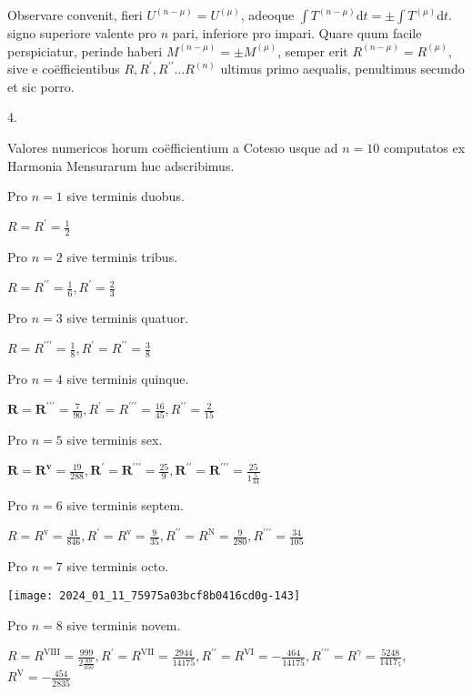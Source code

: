 \documentclass[10pt]{article}
\begin{document}
Observare convenit, fieri \(U^{(n-\mu)}=U^{(\mu)}\), adeoque \(\int T^{(n-\mu)} \mathrm{d} t= \pm \int T^{(\mu)} \mathrm{d} t\). signo superiore valente pro \(n\) pari, inferiore pro impari. Quare quum facile perspiciatur, perinde haberi \(M^{(n-\mu)}= \pm M^{(\mu)}\), semper erit \(R^{(n-\mu)}=R^{(\mu)}\), sive \(\mathrm{e}\) coëfficientibus \(R, R^{\prime}, R^{\prime \prime} \ldots R^{(n)}\) ultimus primo aequalis, penultimus secundo et sic porro.

4.

Valores numericos horum coëfficientium a Cotesıo usque ad \(n=10\) computatos ex Harmonia Mensurarum huc adscribimus.

Pro \(n=1\) sive terminis duobus.

\(R=R^{\prime}=\frac{1}{2}\)

Pro \(n=2\) sive terminis tribus.

\(R=R^{\prime \prime}=\frac{1}{6}, R^{\prime}=\frac{2}{3}\)

Pro \(n=3\) sive terminis quatuor.

\(R=R^{\prime \prime \prime}=\frac{1}{8}, R^{\prime}=R^{\prime \prime}=\frac{3}{8}\)

Pro \(n=4\) sive terminis quinque.

\(\boldsymbol{R}=\boldsymbol{R}^{\prime \prime \prime}=\frac{7}{90}, R^{\prime}=R^{\prime \prime \prime}=\frac{16}{45}, R^{\prime \prime}=\frac{2}{15}\)

Pro \(n=5\) sive terminis sex.

\(\boldsymbol{R}=\boldsymbol{R}^{\mathbf{v}}=\frac{19}{288}, \boldsymbol{R}^{\prime}=\boldsymbol{R}^{\prime \prime \prime}=\frac{25}{9}, \boldsymbol{R}^{\prime \prime}=\boldsymbol{R}^{\prime \prime \prime}=\frac{25}{1 \frac{5}{44}}\)

Pro \(n=6\) sive terminis septem.

\(R=R^{\mathrm{v}}=\frac{41}{846}, R^{\prime}=R^{\mathrm{v}}=\frac{9}{35}, R^{\prime \prime}=R^{\mathrm{N}}=\frac{9}{280}, R^{\prime \prime \prime}=\frac{34}{105}\)

Pro \(n=7\) sive terminis octo.

\begin{center}
\texttt{[image: 2024\_01\_11\_75975a03bcf8b0416cd0g-143]}
\end{center}

Pro \(n=8\) sive terminis novem.

\(R=R^{\mathrm{VIII}}=\frac{999}{2 \frac{89}{350}}, R^{\prime}=R^{\mathrm{VII}}=\frac{2944}{14175}, R^{\prime \prime}=R^{\mathrm{VI}}=-\frac{464}{14175}, R^{\prime \prime \prime}=R^{\gamma}=\frac{5248}{1417_{5}}\), \(R^{\mathrm{V}}=-\frac{454}{2835}\)
\end{document}
